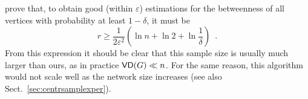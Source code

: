 prove that, to obtain good (within $\varepsilon$) estimations for the
betweenness of all vertices with probability at least $1-\delta$, it must be
\[
r\geq \frac{1}{2\varepsilon^2}\left(\ln n + \ln 2 +\ln\frac{1}{\delta}\right)\enspace.
\]
From this expression it should be clear that this sample size is usually much
larger than ours, as in practice $\mathsf{VD}(G)\ll n$. For the same reason, this
algorithm would not scale well as the network size increases (see also
Sect.~\ref{sec:centrsamplexper}).

